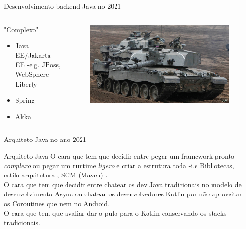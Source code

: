\documentclass[aspectratio=169]{beamer}
\begin{document}
\begin{frame}{Desenvolvimento backend Java no 2021}

\begin{columns}
\begin{column}{0.5\textwidth}

"Complexo"
\begin{itemize}
\item Java EE/Jakarta EE -e.g. JBoss, WebSphere Liberty-
\item Spring
\item Akka
\end{itemize}
\end{column}
\begin{column}{0.5\textwidth}  %
\begin{figure}
	\centering
	\includegraphics[width=0.9\linewidth]{Images/tank}
\end{figure}
\end{column}
\end{columns}

\end{frame}

\begin{frame}{Arquiteto Java no ano 2021}

\begin{exampleblock}{Arquiteto Java}
O cara que tem que decidir entre pegar um framework pronto \textit{complexo} ou pegar um runtime \textit{ligero} e criar a estrutura toda -i.e Bibliotecas, estilo arquitetural, SCM (Maven)-.\\


O cara que tem que decidir entre chatear os dev Java tradicionais no modelo de desenvolvimento Async ou chatear os desenvolvedores Kotlin por não aproveitar os Coroutines que nem no Android.\\

O cara que tem que avaliar dar o pulo para o Kotlin conservando os stacks tradicionais.

\end{exampleblock}
\end{frame}
\end{document}
